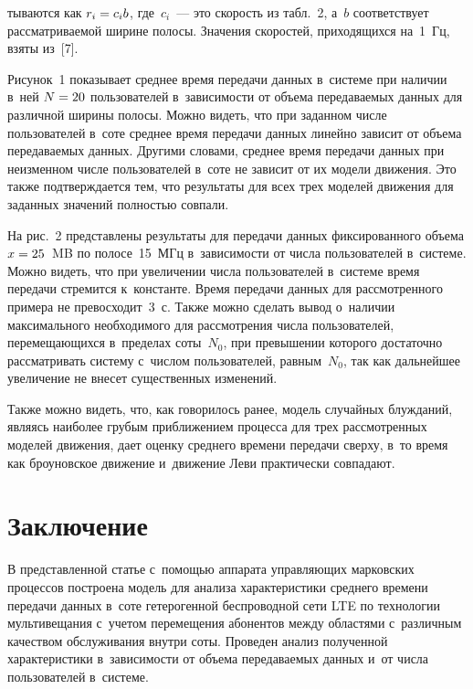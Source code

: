 \begin{multicols}{2}
\vspace*{12pt}


  
  
\addtocounter{table}{1}





\noindent 
тываются как $r_i\hm= c_i b$, где~$c_i$~--- это скорость из
табл.~2, а~$b$ соответствует рассматриваемой ширине полосы. Значения 
скоростей, приходящихся на~1~Гц, взяты из~[7].
  



  
  

  
  
  Рисунок~1 показывает среднее время передачи данных в~системе при наличии 
в~ней $N\hm=20$ пользователей в~зависимости от объема передаваемых данных 
для различной ширины полосы. Можно видеть, что при заданном числе 
пользователей в~соте среднее время передачи данных линейно зависит от объема 
передаваемых данных. Другими словами, среднее время передачи данных при 
неизменном числе пользователей в~соте не зависит от их модели движения. Это 
также подтверждается тем, что результаты для всех трех моделей движения для 
заданных значений полностью совпали.

  
  На рис.~2 представлены результаты для передачи данных фиксированного 
объема $x\hm=25$~MB по полосе~15~МГц в~зависимости от числа 
пользователей в~системе. Можно видеть, что при увеличении числа 
пользователей в~системе время передачи стремится к~константе. Время передачи 
данных для рассмотренного примера не превосходит~3~с. 
Также можно сделать 
вывод о~наличии максимального необходимого для рассмотрения числа 
пользователей, перемещающихся в~пределах соты~$N_0$, при превышении 
которого достаточно рассматривать систему с~числом пользователей, 
равным~$N_0$, так как дальнейшее увеличение не внесет существенных 
изменений. 

Также можно видеть, что, как говорилось ранее, модель случайных 
блужданий, являясь наиболее грубым приближением процесса для трех 
рас\-смот\-рен\-ных моделей движения, дает оценку среднего времени передачи 
сверху, в~то время как броуновское движение и~движение Леви практически 
совпадают.

\section{Заключение}

  В представленной статье с~помощью аппарата управляющих марковских 
процессов построена модель для анализа характеристики среднего времени 
передачи данных в~соте гетерогенной беспроводной сети LTE по технологии 
мультивещания с~учетом перемещения абонентов между областями с~различным 
качеством обслуживания внутри соты. Проведен анализ полученной 
характеристики в~зависимости от объема передаваемых данных и~от чис\-ла 
пользователей в~системе. 
  

\end{multicols}
